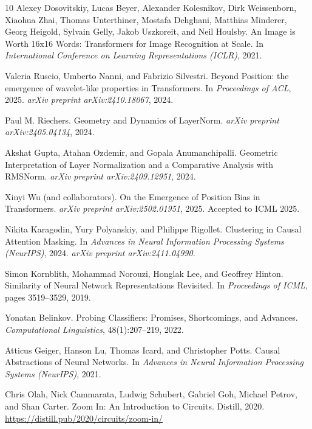 \documentclass[11pt]{article}
\theoremstyle{definition}
\begin{document}
\begin{thebibliography}{10}
Alexey Dosovitskiy, Lucas Beyer, Alexander Kolesnikov, Dirk Weissenborn, Xiaohua Zhai, Thomas Unterthiner, Mostafa Dehghani, Matthias Minderer, Georg Heigold, Sylvain Gelly, Jakob Uszkoreit, and Neil Houlsby.
\newblock An Image is Worth 16x16 Words: Transformers for Image Recognition at Scale.
\newblock In \emph{International Conference on Learning Representations (ICLR)}, 2021.

Valeria Ruscio, Umberto Nanni, and Fabrizio Silvestri.
\newblock Beyond Position: the emergence of wavelet-like properties in Transformers.
\newblock In \emph{Proceedings of ACL}, 2025.
\newblock \emph{arXiv preprint arXiv:2410.18067}, 2024.

Paul M. Riechers.
\newblock Geometry and Dynamics of LayerNorm.
\newblock \emph{arXiv preprint arXiv:2405.04134}, 2024.

Akshat Gupta, Atahan Ozdemir, and Gopala Anumanchipalli.
\newblock Geometric Interpretation of Layer Normalization and a Comparative Analysis with RMSNorm.
\newblock \emph{arXiv preprint arXiv:2409.12951}, 2024.

Xinyi Wu (and collaborators).
\newblock On the Emergence of Position Bias in Transformers.
\newblock \emph{arXiv preprint arXiv:2502.01951}, 2025.
\newblock Accepted to ICML 2025.

Nikita Karagodin, Yury Polyanskiy, and Philippe Rigollet.
\newblock Clustering in Causal Attention Masking.
\newblock In \emph{Advances in Neural Information Processing Systems (NeurIPS)}, 2024.
\newblock \emph{arXiv preprint arXiv:2411.04990}.

Simon Kornblith, Mohammad Norouzi, Honglak Lee, and Geoffrey Hinton.
\newblock Similarity of Neural Network Representations Revisited.
\newblock In \emph{Proceedings of ICML}, pages 3519--3529, 2019.

Yonatan Belinkov.
\newblock Probing Classifiers: Promises, Shortcomings, and Advances.
\newblock \emph{Computational Linguistics}, 48(1):207--219, 2022.

Atticus Geiger, Hanson Lu, Thomas Icard, and Christopher Potts.
\newblock Causal Abstractions of Neural Networks.
\newblock In \emph{Advances in Neural Information Processing Systems (NeurIPS)}, 2021.

Chris Olah, Nick Cammarata, Ludwig Schubert, Gabriel Goh, Michael Petrov, and Shan Carter.
\newblock Zoom In: An Introduction to Circuits.
\newblock Distill, 2020.
\newblock \url{https://distill.pub/2020/circuits/zoom-in/}


\end{thebibliography}
\end{document}
